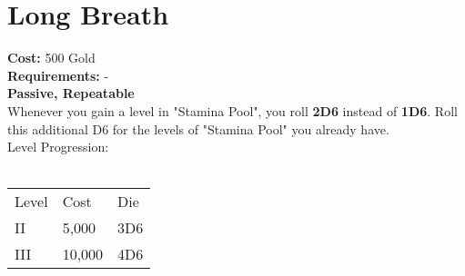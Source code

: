 \section{Long Breath}\label{sec:longbreath}
\textbf{Cost:} 500 Gold\\
\textbf{Requirements:} -\\
\textbf{Passive, Repeatable}\\
Whenever you gain a level in "Stamina Pool", you roll \textbf{2D6} instead of \textbf{1D6}.
Roll this additional D6 for the levels of "Stamina Pool" you already have.\\
Level Progression:\\
\\
\begin{tabular}{l | l | l }
	Level & Cost & Die\\
	II & 5,000 & 3D6 \\
	III & 10,000 & 4D6\\
\end{tabular}